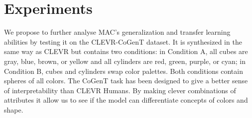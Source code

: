 \section{Experiments}

We propose to further analyse MAC’s generalization and transfer learning abilities by testing it on the CLEVR-CoGenT dataset. It is synthesized in the same way as CLEVR but contains two conditions: in Condition A, all cubes are gray, blue, brown, or yellow and all cylinders are red, green, purple, or cyan; in Condition B, cubes and cylinders swap color palettes. Both conditions contain spheres of all colors. The CoGenT task has been designed to give a better sense of interpretability than CLEVR Humans. By making clever combinations of attributes it allow us to see  if the model can differentiate concepts of colors and shape.